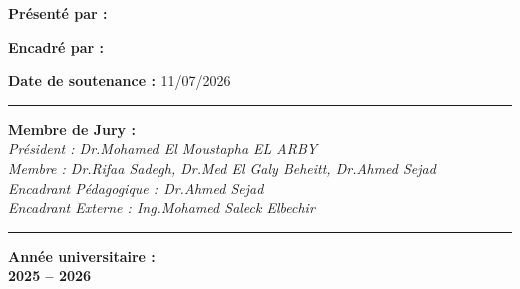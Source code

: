 ﻿\documentclass[12pt,a4paper]{report}
\begin{document}
\begin{titlepage}
\begin{center}
\vspace{0.35cm}

\begin{minipage}{0.42\textwidth}
\centering
\textbf{Présenté par :}\\[0.12cm]

\end{minipage}
\hfill
\begin{minipage}{0.42\textwidth}
\centering
\textbf{Encadré par :}\\[0.12cm]

\end{minipage}

\vspace{0.45cm}

\begin{flushright}
\small\textbf{Date de soutenance :} 11/07/2026
\end{flushright}

\vspace{0.1cm}
\hrule
\vspace{0.1cm}

\begin{flushleft}
\small
\textbf{Membre de Jury :}\\
\textit{Président : Dr.Mohamed El Moustapha EL ARBY} \\
\textit{Membre : Dr.Rifaa Sadegh, Dr.Med El Galy Beheitt, Dr.Ahmed Sejad} \\
\textit{Encadrant Pédagogique : Dr.Ahmed Sejad} \\
\textit{Encadrant Externe : Ing.Mohamed Saleck Elbechir}
\end{flushleft}

\vspace{0.1cm}
\hrule

\vfill

{\small\textbf{Année universitaire :}}\\
{\small\textbf{2025 -- 2026}}

\end{center}
\end{titlepage}
\end{document}
